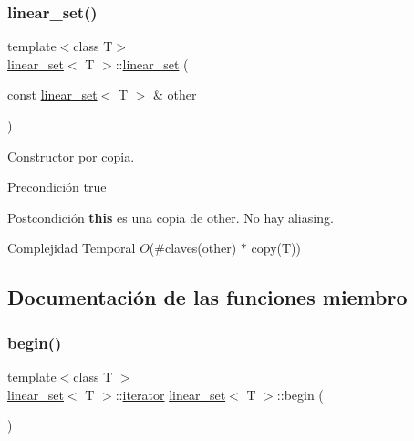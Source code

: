 \subsubsection{\texorpdfstring{linear\+\_\+set()}{linear\_set()}\hspace{0.1cm}{\footnotesize\ttfamily [4/4]}}
{\footnotesize\ttfamily template$<$class T$>$ \\
\mbox{\hyperlink{classlinear__set}{linear\+\_\+set}}$<$ T $>$\+::\mbox{\hyperlink{classlinear__set}{linear\+\_\+set}} (\begin{DoxyParamCaption}\item[{const \mbox{\hyperlink{classlinear__set}{linear\+\_\+set}}$<$ T $>$ \&}]{other }\end{DoxyParamCaption})}



Constructor por copia. 

\begin{DoxyPrecond}{Precondición}
true 
\end{DoxyPrecond}
\begin{DoxyPostcond}{Postcondición}
{\bfseries this} es una copia de other. No hay aliasing.
\end{DoxyPostcond}

\begin{DoxyDescription}
\item[Complejidad Temporal]$O$(\#claves(other) $\ast$ copy(\+T))
\end{DoxyDescription}

\subsection{Documentación de las funciones miembro}
\mbox{\label{classlinear__set_a80bad302b65a43aba2a0fbf5e4637a59}} 
\subsubsection{\texorpdfstring{begin()}{begin()}\hspace{0.1cm}{\footnotesize\ttfamily [1/2]}}
{\footnotesize\ttfamily template$<$class T $>$ \\
\mbox{\hyperlink{classlinear__set}{linear\+\_\+set}}$<$ T $>$\+::\mbox{\hyperlink{classlinear__set_1_1iterator}{iterator}} \mbox{\hyperlink{classlinear__set}{linear\+\_\+set}}$<$ T $>$\+::begin (\begin{DoxyParamCaption}{ }\end{DoxyParamCaption})}



